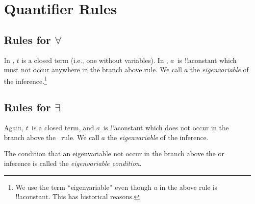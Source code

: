 \documentclass[10pt,a4paper]{article}
\theoremstyle{plain}
\theoremstyle{definition}
\theoremstyle{remark}
\newcommand*{\olfileid}[3]{}
\newcommand*{\olsection}[1]{\section*{#1}}
\providecommand{\AxiomC}[1]{}
\providecommand{\UnaryInfC}[1]{}
\providecommand{\RightLabel}[1]{}
\providecommand{\DisplayProof}{}
\providecommand{\lforall}{\mathord{\forall}}
\providecommand{\lexists}{\mathord{\exists}}
\providecommand{\sFmla}[2]{#1(#2)}
\providecommand{\True}{\top}
\providecommand{\False}{\bot}
\providecommand{\TRule}[1]{}
\begin{document}



\olfileid{fol}{tab}{qrl}

\olsection{Quantifier Rules}

\subsection{Rules for $\lforall$}

\begin{defish}
\AxiomC{\sFmla{\True}{\lforall[x][!A(x)]}}
\RightLabel{\TRule{\True}{\forall}}
\UnaryInfC{\sFmla{\True}{!A(t)}}
\DisplayProof
\hfill
\AxiomC{\sFmla{\False}{\lforall[x][!A(x)]}}
\RightLabel{\TRule{\False}{\lforall}}
\UnaryInfC{\sFmla{\False}{!A(a)}}
\DisplayProof
\end{defish}

In \TRule{\True}{\lforall}, $t$ is a closed term (i.e., one without
variables). In \TRule{\False}{\lforall}, $a$~is !!a{constant} which
must not occur anywhere in the branch above \TRule{\False}{\lforall}
rule. We call $a$ the \emph{eigenvariable} of the
\TRule{\False}{\forall} inference.\footnote{We use the term
``eigenvariable'' even though $a$ in the above rule is !!a{constant}.
This has historical reasons.}

\subsection{Rules for $\lexists$}

\begin{defish}
\AxiomC{\sFmla{\True}{\lexists[x][!A(x)]}}
\RightLabel{\TRule{\True}{\lexists}}
\UnaryInfC{\sFmla{\True}{!A(a)}}
\DisplayProof
\hfill
\AxiomC{\sFmla{\False}{\lexists[x][!A(x)]}}
\RightLabel{\TRule{\False}{\lexists}}
\UnaryInfC{\sFmla{\False}{!A(t)}}
\DisplayProof
\end{defish}

Again, $t$~is a closed term, and $a$~is !!a{constant} which does not
occur in the branch above the~\TRule{\True}{\lexists} rule. We call
$a$ the \emph{eigenvariable} of the \TRule{\True}{\lexists} inference.

The condition that an eigenvariable not occur in the branch above the
\TRule{\False}{\lforall} or \TRule{\True}{\lexists} inference is
called the \emph{eigenvariable condition}.
\end{document}
